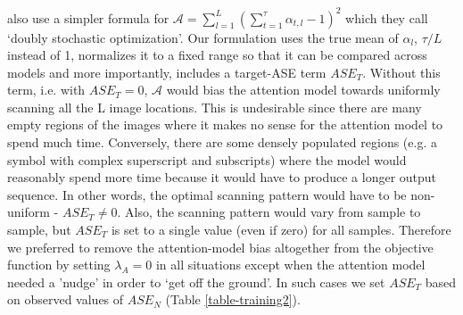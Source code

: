 \documentclass{article}
\begin{document}
\citealt{Xu2015ShowAA} also use a simpler formula for $\mathcal{A} = \sum_{l=1}^{L} \left( \sum_{t=1}^{\tau}\alpha_{t,l} -1 \right)^2$ which they call `doubly stochastic optimization'. Our formulation uses the true mean of $\alpha_l$, $\tau / L$ instead of 1, normalizes it to a fixed range so that it can be compared across models and more importantly, includes a target-ASE term $ASE_T$. Without this term, i.e. with $ASE_T=0$, $\mathcal{A}$ would bias the attention model towards uniformly scanning all the L image locations. This is undesirable since there are many empty regions of the images where it makes no sense for the attention model to spend much time. Conversely, there are some densely populated regions (e.g. a symbol with complex superscript and subscripts) where the model would reasonably spend more time because it would have to produce a longer output sequence. In other words, the optimal scanning pattern would have to be non-uniform - $ASE_T \neq 0$. Also, the scanning pattern would vary from sample to sample, but $ASE_T$ is set to a single value (even if zero) for all samples. Therefore we preferred to remove the attention-model bias altogether from the objective function by setting $\lambda_A=0$ in all situations except when the attention model needed a 'nudge' in order to `get off the ground'. In such cases we set $ASE_T$ based on observed values of $ASE_N$ (Table \ref{table-training2}).
\end{document}
